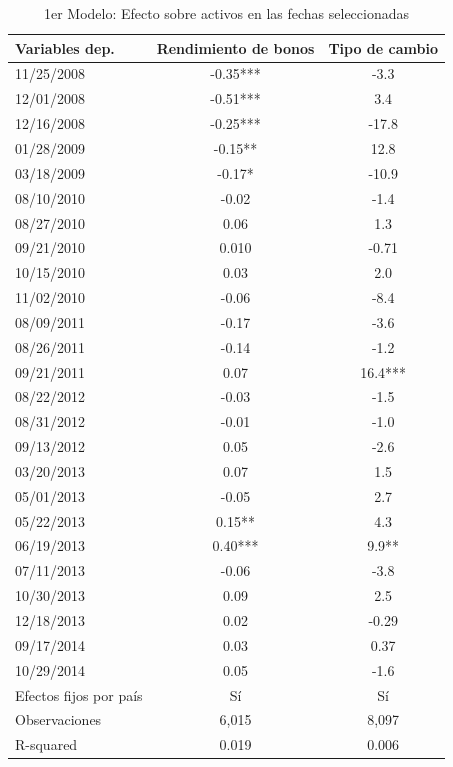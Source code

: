 \documentclass[
  9.5pt,
]{article}
\begin{document}
\begin{table}[H]
  \begin{center}
    \begin{tabular}{ m{3cm}  c  c }
      \hline
Variables dep.  & Rendimiento de bonos  & Tipo de cambio  \\ \hline
11/25/2008  & -0.35***  & -3.3 \\
12/01/2008 & -0.51***   & 3.4 \\
12/16/2008 & -0.25***   & -17.8 \\
01/28/2009 & -0.15**    & 12.8 \\
03/18/2009 & -0.17* & -10.9 \\
08/10/2010 & -0.02  & -1.4 \\
08/27/2010 & 0.06   & 1.3 \\
09/21/2010 & 0.010  & -0.71 \\
10/15/2010 & 0.03   & 2.0 \\
11/02/2010 & -0.06  & -8.4 \\
08/09/2011 & -0.17  & -3.6 \\
08/26/2011 & -0.14  & -1.2 \\
09/21/2011 & 0.07   & 16.4*** \\
08/22/2012 & -0.03  & -1.5 \\
08/31/2012 & -0.01  & -1.0 \\
09/13/2012 & 0.05   & -2.6 \\
03/20/2013 & 0.07   & 1.5 \\
05/01/2013 & -0.05  & 2.7 \\
05/22/2013 & 0.15** & 4.3 \\
06/19/2013 & 0.40***    & 9.9** \\
07/11/2013 & -0.06  & -3.8 \\
10/30/2013 & 0.09   & 2.5 \\
12/18/2013 & 0.02   & -0.29 \\
09/17/2014 & 0.03   & 0.37 \\
10/29/2014 & 0.05   & -1.6 \\ \hline
Efectos fijos por país  & Sí    & Sí \\ \hline
Observaciones   & 6,015 & 8,097 \\
R-squared   & 0.019 & 0.006 \\ \hline
    \end{tabular}
    \caption{1er Modelo: Efecto sobre activos en las fechas seleccionadas}
  \end{center}
\end{table}
\end{document}
